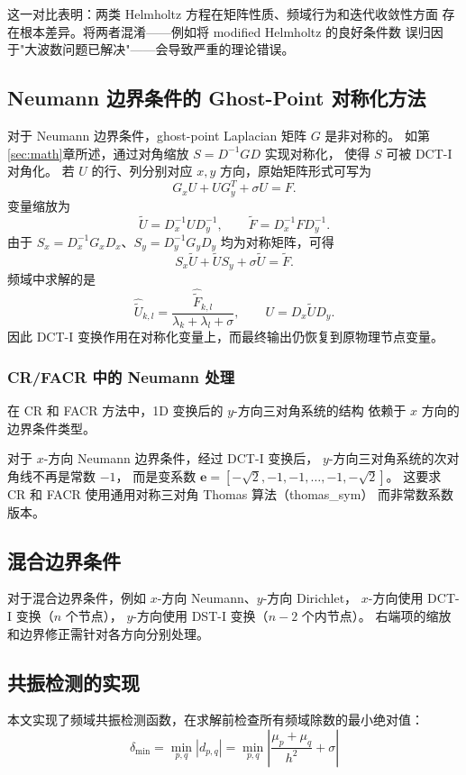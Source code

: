 这一对比表明：两类 Helmholtz 方程在矩阵性质、频域行为和迭代收敛性方面
存在根本差异。将两者混淆——例如将 modified Helmholtz 的良好条件数
误归因于"大波数问题已解决"——会导致严重的理论错误。

\subsection{Neumann 边界条件的 Ghost-Point 对称化方法}

对于 Neumann 边界条件，ghost-point Laplacian 矩阵 $G$ 是非对称的。
如第\ref{sec:math}章所述，通过对角缩放 $S = D^{-1}GD$ 实现对称化，
使得 $S$ 可被 DCT-I 对角化。
若 $U$ 的行、列分别对应 $x,y$ 方向，原始矩阵形式可写为
\[
  G_xU+UG_y^T+\sigma U=F.
\]
变量缩放为
\[
  \tilde U=D_x^{-1}UD_y^{-1},
  \qquad
  \tilde F=D_x^{-1}FD_y^{-1}.
\]
由于 $S_x=D_x^{-1}G_xD_x$、$S_y=D_y^{-1}G_yD_y$ 均为对称矩阵，可得
\[
  S_x\tilde U+\tilde U S_y+\sigma\tilde U=\tilde F.
\]
频域中求解的是
\[
  \widehat{\tilde U}_{k,l}
  =\frac{\widehat{\tilde F}_{k,l}}{\lambda_k+\lambda_l+\sigma},
  \qquad U=D_x\tilde U D_y.
\]
因此 DCT-I 变换作用在对称化变量上，而最终输出仍恢复到原物理节点变量。

\subsubsection{CR/FACR 中的 Neumann 处理}

在 CR 和 FACR 方法中，1D 变换后的 $y$-方向三对角系统的结构
依赖于 $x$ 方向的边界条件类型。

对于 $x$-方向 Neumann 边界条件，经过 DCT-I 变换后，
$y$-方向三对角系统的次对角线不再是常数 $-1$，
而是变系数 $\mathbf{e} = [-\sqrt{2}, -1, -1, \ldots, -1, -\sqrt{2}]$。
这要求 CR 和 FACR 使用通用对称三对角 Thomas 算法（thomas\_sym）
而非常数系数版本。

\subsection{混合边界条件}

对于混合边界条件，例如 $x$-方向 Neumann、$y$-方向 Dirichlet，
$x$-方向使用 DCT-I 变换（$n$ 个节点），
$y$-方向使用 DST-I 变换（$n-2$ 个内节点）。
右端项的缩放和边界修正需针对各方向分别处理。

\subsection{共振检测的实现}

本文实现了频域共振检测函数，在求解前检查所有频域除数的最小绝对值：
\begin{equation}
  \delta_{\min} = \min_{p,q} |d_{p,q}| = \min_{p,q} \left|\frac{\mu_p+\mu_q}{h^2}+\sigma\right|
\end{equation}

